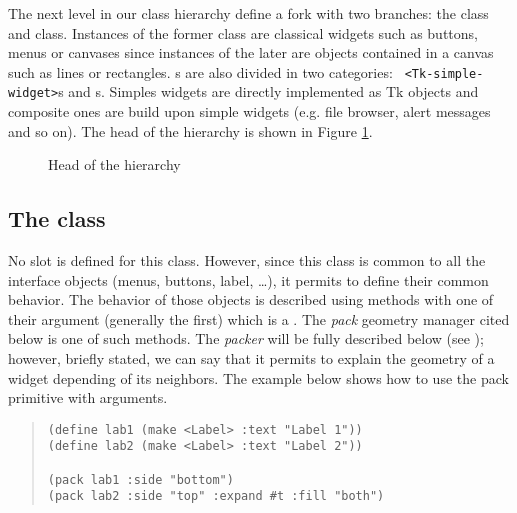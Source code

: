 The next level in our class hierarchy define a fork with two branches: the
{\tt <Tk-widget>} class and {\tt<Tk-canvas-item>}
 class. Instances of the
former class are classical widgets such as buttons, menus or canvases since
instances of the later are objects contained in a canvas such as lines or
rectangles.  {\tt <Tk-widget>}s are also divided in two categories: {\tt
<Tk-simple-widget>}s and {\tt <Tk-composite-widget>}s. Simples widgets are
directly implemented as Tk objects and composite ones are build upon simple
widgets (e.g. file browser, alert messages and so on). The head of the
{\stklos} hierarchy is shown in Figure \ref{Head-hierarchy}.
\begin{figure}
\centerline{}
\caption{Head of the {\stklos} hierarchy}
\label{Head-hierarchy}
\end{figure}

\subsection{The {\tt <Tk-widget>} class}

No slot is defined for this class. However, since this class is common to all
the interface objects (menus, buttons, label, \ldots), it permits to define
their common behavior. The behavior of those objects is described using
{\stklos} methods with one of their argument (generally the first) which is a
{\tt <Tk-widget>}. The {\em pack} geometry manager cited below is
one of such methods. The {\em packer} will be fully described below (see
\pageref{packer-doc}); however, briefly stated, we can say that it permits to
explain the geometry of a widget depending of its neighbors.  The example below
shows how to use the pack primitive with arguments.
\begin{quote}
\begin{verbatim}
(define lab1 (make <Label> :text "Label 1"))
(define lab2 (make <Label> :text "Label 2"))

(pack lab1 :side "bottom")
(pack lab2 :side "top" :expand #t :fill "both")
\end{verbatim}
\end{quote}

